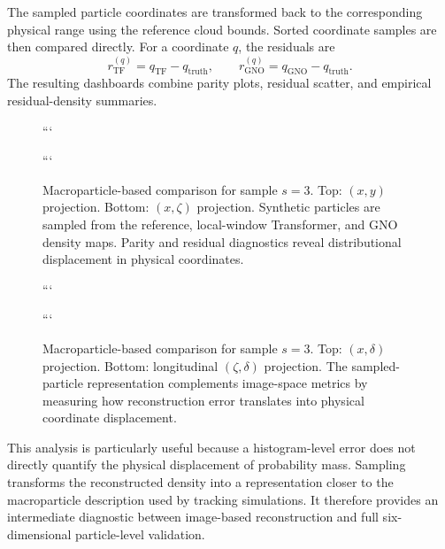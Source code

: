 The sampled particle coordinates are transformed back to the corresponding physical range using the reference cloud bounds. Sorted coordinate samples are then compared directly. For a coordinate \(q\), the residuals are
\begin{equation}
r_{\mathrm{TF}}^{(q)}
=
q_{\mathrm{TF}}
-
q_{\mathrm{truth}},
\qquad
r_{\mathrm{GNO}}^{(q)}
=
q_{\mathrm{GNO}}
-
q_{\mathrm{truth}}.
\label{eq:sampled_coordinate_residuals}
\end{equation}
The resulting dashboards combine parity plots, residual scatter, and empirical residual-density summaries.

\begin{figure}[p]
\centering
{}

```
\vspace{0.8em}


\caption{
Macroparticle-based comparison for sample \(s=3\). Top: \((x,y)\) projection. Bottom: \((x,\zeta)\) projection. Synthetic particles are sampled from the reference, local-window Transformer, and GNO density maps. Parity and residual diagnostics reveal distributional displacement in physical coordinates.
}
\label{fig:sampling_comparison_xy_xzeta}
```

\end{figure}

\begin{figure}[p]
\centering
{}

```
\vspace{0.8em}


\caption{
Macroparticle-based comparison for sample \(s=3\). Top: \((x,\delta)\) projection. Bottom: longitudinal \((\zeta,\delta)\) projection. The sampled-particle representation complements image-space metrics by measuring how reconstruction error translates into physical coordinate displacement.
}
\label{fig:sampling_comparison_xdelta_longitudinal}
```

\end{figure}

This analysis is particularly useful because a histogram-level error does not directly quantify the physical displacement of probability mass. Sampling transforms the reconstructed density into a representation closer to the macroparticle description used by tracking simulations. It therefore provides an intermediate diagnostic between image-based reconstruction and full six-dimensional particle-level validation.

